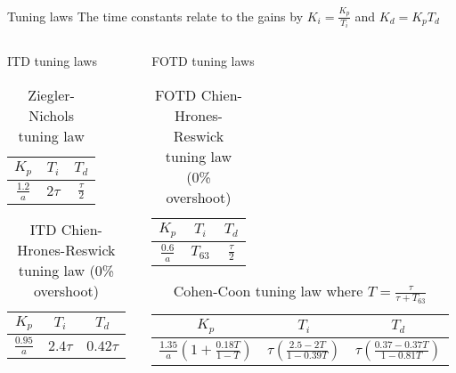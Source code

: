 \documentclass[9pt]{beamer-control}
\begin{document}
\begin{frame}{Tuning laws}
	\centering
	The time constants relate to the gains by $K_i= \frac{K_p}{T_i}$ and $K_d = K_p T_d$\\
	\vfill
	
	\begin{columns}
		\begin{column}{0.5\textwidth}
			ITD tuning laws
			\begin{table}
				\centering
				\begin{tabular}{|c|c|c|}
					\hline
					$K_p$ & $T_i$ & $T_d$\\
					\hline
					$\frac{1.2}{a}$ & $2\tau$ & $\frac{\tau}{2}$\\
					\hline	
				\end{tabular}
				\caption{Ziegler-Nichols tuning law}
			\end{table}
			
			\begin{table}
				\centering
				\begin{tabular}{|c|c|c|}
					\hline
					$K_p$ & $T_i$ & $T_d$\\
					\hline
					$\frac{0.95}{a}$ & $2.4 \tau$ & $0.42 \tau$\\
					\hline	
				\end{tabular}
				\caption{ITD Chien-Hrones-Reswick tuning law (0\% overshoot)}
			\end{table}
		\end{column}
		\begin{column}{0.5\textwidth} 
			
			FOTD tuning laws
			\begin{table}
				\centering
				\begin{tabular}{|c|c|c|}
					\hline
					$K_p$ & $T_i$ & $T_d$\\
					\hline
					$\frac{0.6}{a}$ & $T_{63}$ & $\frac{\tau}{2}$\\
					\hline	
				\end{tabular}
				\caption{FOTD Chien-Hrones-Reswick tuning law (0\% overshoot)}
			\end{table}
			
			\begin{table}
				\centering
				\begin{tabular}{|c|c|c|}
					\hline
					$K_p$ & $T_i$ & $T_d$\\
					\hline
					\tiny{$\frac{1.35}{a}\left(1 + \frac{0.18 T}{1-T} \right)$} & \tiny{$ \tau\left( \frac{2.5-2T}{1-0.39T} \right) $} & \tiny{$\tau \left( \frac{0.37-0.37T}{1-0.81T} \right)$}\\
					\hline	
				\end{tabular}
				\caption{Cohen-Coon tuning law where $T=\frac{\tau}{\tau+T_{63}}$}
			\end{table}
		\end{column}
	\end{columns}
	
	
\end{frame}
\end{document}
